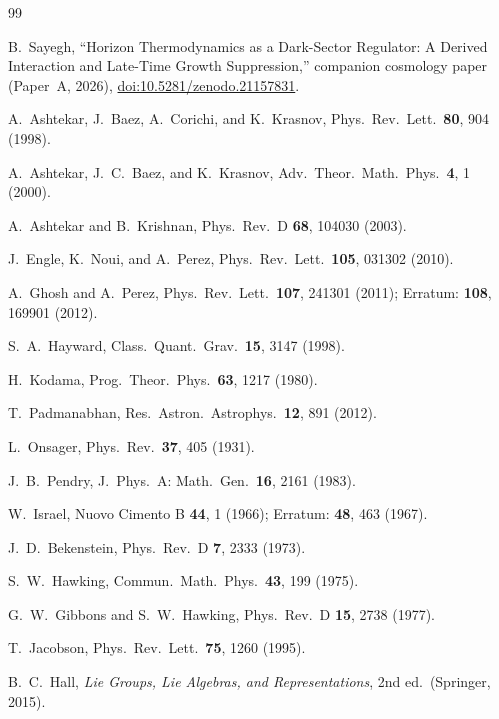 \documentclass[aps,prd,twocolumn,10pt,superscriptaddress,nofootinbib]{revtex4-2}
\begin{document}
\begin{thebibliography}{99}

B.~Sayegh,
``Horizon Thermodynamics as a Dark-Sector Regulator: A Derived Interaction
and Late-Time Growth Suppression,'' companion cosmology paper (Paper~A,
2026),
\href{https://doi.org/10.5281/zenodo.21157831}{doi:10.5281/zenodo.21157831}.

A.~Ashtekar, J.~Baez, A.~Corichi, and K.~Krasnov,
Phys.\ Rev.\ Lett.\ \textbf{80}, 904 (1998).

A.~Ashtekar, J.~C.~Baez, and K.~Krasnov,
Adv.\ Theor.\ Math.\ Phys.\ \textbf{4}, 1 (2000).

A.~Ashtekar and B.~Krishnan,
Phys.\ Rev.\ D \textbf{68}, 104030 (2003).

J.~Engle, K.~Noui, and A.~Perez,
Phys.\ Rev.\ Lett.\ \textbf{105}, 031302 (2010).

A.~Ghosh and A.~Perez,
Phys.\ Rev.\ Lett.\ \textbf{107}, 241301 (2011);
Erratum: \textbf{108}, 169901 (2012).

S.~A.~Hayward,
Class.\ Quant.\ Grav.\ \textbf{15}, 3147 (1998).

H.~Kodama,
Prog.\ Theor.\ Phys.\ \textbf{63}, 1217 (1980).

T.~Padmanabhan,
Res.\ Astron.\ Astrophys.\ \textbf{12}, 891 (2012).

L.~Onsager,
Phys.\ Rev.\ \textbf{37}, 405 (1931).

J.~B.~Pendry,
J.\ Phys.\ A: Math.\ Gen.\ \textbf{16}, 2161 (1983).

W.~Israel,
Nuovo Cimento B \textbf{44}, 1 (1966);
Erratum: \textbf{48}, 463 (1967).

J.~D.~Bekenstein,
Phys.\ Rev.\ D \textbf{7}, 2333 (1973).

S.~W.~Hawking,
Commun.\ Math.\ Phys.\ \textbf{43}, 199 (1975).

G.~W.~Gibbons and S.~W.~Hawking,
Phys.\ Rev.\ D \textbf{15}, 2738 (1977).

T.~Jacobson,
Phys.\ Rev.\ Lett.\ \textbf{75}, 1260 (1995).

B.~C.~Hall,
\textit{Lie Groups, Lie Algebras, and Representations},
2nd ed.\ (Springer, 2015).


\end{thebibliography}
\end{document}
